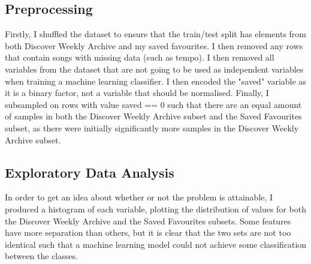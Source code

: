 \documentclass{article}
\begin{document}
		\subsection{Preprocessing}
		Firstly, I shuffled the dataset to ensure that the train/test split has elements from both Discover Weekly Archive and my saved favourites. I then removed any rows that contain songs with missing data (such as tempo). I then removed all variables from the dataset that are not going to be used as independent variables when training a machine learning classifier. I then encoded the "saved" variable as it is a binary factor, not a variable that should be normalised. Finally, I subsampled on rows with value saved == 0 such that there are an equal amount of samples in both the Discover Weekly Archive subset and the Saved Favourites subset, as there were initially significantly more samples in the Discover Weekly Archive subset.
		
		\subsection{Exploratory Data Analysis}
		In order to get an idea about whether or not the problem is attainable, I produced a histogram of each variable, plotting the distribution of values for both the Discover Weekly Archive and the Saved Favourites subsets. Some features have more separation than others, but it is clear that the two sets are not too identical such that a machine learning model could not achieve some classification between the classes.
		
\end{document}
